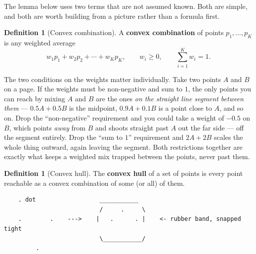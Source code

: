 \documentclass[11pt]{article}
\theoremstyle{definition}
\newtheorem{definition}[theorem]{Definition}
\begin{document}
The lemma below uses two terms that are not assumed known. Both are simple, and both are worth building from a picture rather than a formula first.

\begin{definition}[Convex combination]
\label{def:convex-combo}
A \textbf{convex combination} of points $p_1,\dots,p_K$ is any weighted average
\[
w_1p_1 + w_2p_2 + \cdots + w_Kp_K,
\qquad w_i \ge 0,\qquad \sum_{i=1}^{K}w_i = 1.
\]
\end{definition}

The two conditions on the weights matter individually. Take two points $A$ and $B$ on a page. If the weights must be non-negative and sum to $1$, the only points you can reach by mixing $A$ and $B$ are the ones \emph{on the straight line segment between them} --- $0.5A+0.5B$ is the midpoint, $0.9A+0.1B$ is a point close to $A$, and so on. Drop the ``non-negative'' requirement and you could take a weight of $-0.5$ on $B$, which points \emph{away} from $B$ and shoots straight past $A$ out the far side --- off the segment entirely. Drop the ``sum to $1$'' requirement and $2A+2B$ scales the whole thing outward, again leaving the segment. Both restrictions together are exactly what keeps a weighted mix trapped between the points, never past them.

\begin{definition}[Convex hull]
The \textbf{convex hull} of a set of points is every point reachable as a convex combination of some (or all) of them.
\end{definition}

\begin{center}
\end{center}

\begin{lstlisting}
    . dot                  ___________
                           /     .     \
    .        .    --->    |   .      . |    <- rubber band, snapped tight
                           \___________/
         .
\end{lstlisting}
\end{document}
